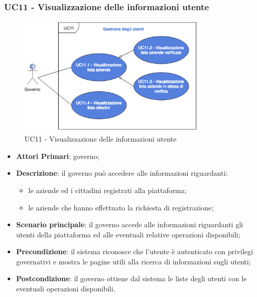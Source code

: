  \subsubsection{UC11 - Visualizzazione delle informazioni utente}
 \begin{figure}[h]
 	\includegraphics[width=9cm]{res/images/UC11.png}
 	\centering
 	\caption{UC11 - Visualizzazione delle informazioni utente}
 	
 \end{figure}
 \begin{itemize}
 	\item \textbf{Attori Primari}: governo;
 	\item \textbf{Descrizione}: il governo può accedere alle informazioni riguardanti:
 	\begin{itemize}
 		\item le aziende ed i cittadini registrati alla piattaforma;
 		\item le aziende che hanno effettuato la richiesta di registrazione;
 	\end{itemize}
 	\item \textbf{Scenario principale}: il governo accede alle informazioni riguardanti gli utenti della piattaforma ed alle eventuali relative operazioni disponibili;

 	\item \textbf{Precondizione}: il sistema riconosce che l'utente è autenticato con privilegi governativi e mostra le pagine utili alla ricerca di informazioni sugli utenti;
 	
 	\item \textbf{Postcondizione}: il governo ottiene dal sistema le liste degli utenti con le eventuali operazioni disponibili.
 \end{itemize}
